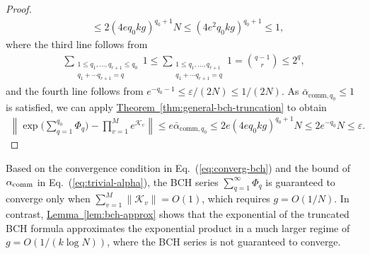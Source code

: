 \documentclass[11pt]{article}
\newcommand{\eq}[1]{(\ref{eq:#1})}
\newcommand{\thm}[1]{\hyperref[thm:#1]{Theorem~\ref*{thm:#1}}}
\newcommand{\lem}[1]{\hyperref[lem:#1]{Lemma~\ref*{lem:#1}}}
\renewcommand{\comm}{\mathrm{comm}}
\newcommand{\eps}{\varepsilon}
\newcommand{\mc}{\mathcal}
\begin{document}
\begin{proof}
\begin{align*}
    &\le 2(4eq_0kg)^{q_0+1}N \le (4e^2q_0 kg)^{q_0+1}\le 1,
\end{align*}
where the third line follows from 
\begin{align*}
    \sum_{\substack{1\le q_1, \ldots, q_{r+1}\le q_0\\q_1+\cdots q_{r+1}=q}}1\le  \sum_{\substack{1\le q_1, \ldots, q_{r+1}\\q_1+\cdots q_{r+1}=q}}1=\binom{q-1}{r}\le 2^q,
\end{align*}
and the fourth line follows from $e^{-q_0-1} \le \eps/(2N) \le 1/(2N)$.
As $\bar{\alpha}_{\comm,q_0}\le 1$ is satisfied, we can apply \thm{general-bch-truncation} to obtain 
\begin{align*}
\left\|\exp\Big(\sum_{q=1}^{q_0} \Phi_q\Big) - \prod_{v = 1}^Me^{\mc K_v} \right\|
\le  e\bar{\alpha}_{\comm,q_0}
\le 2e(4eq_0kg)^{q_0+1}N\le 2e^{-q_0}N\le \eps.
\end{align*}
\end{proof}
Based on the convergence condition in Eq.~\eq{converg-bch} and the bound of $\alpha_{\rm comm}$ in Eq.~\eq{trivial-alpha}, the BCH series $\sum_{q=1}^{\infty} \Phi_q$ is guaranteed to converge only when $\sum_{v=1}^M \|\mc K_v\| = O(1)$, which requires $g = O(1/N)$. In contrast, \lem{bch-approx}  shows that the exponential of the truncated BCH formula approximates the exponential product in a much larger regime of $g = O(1/(k\log N))$, where the BCH series is not guaranteed to converge. 

\end{document}

